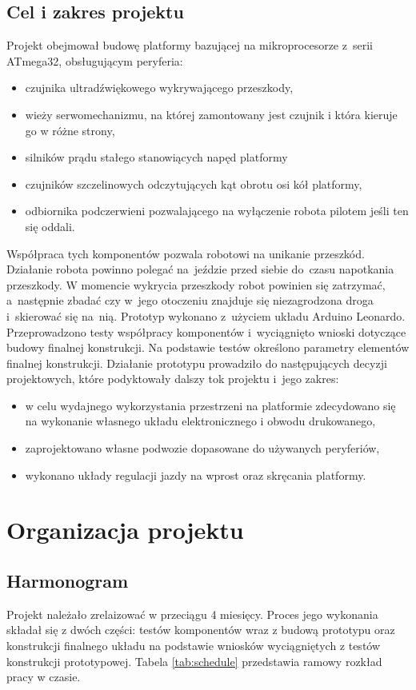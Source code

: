 \documentclass{article}
\begin{document}
\subsection{Cel i zakres projektu}
Projekt obejmował budowę platformy bazującej na mikroprocesorze z~serii ATmega32, obsługującym peryferia:
\begin{itemize}
	\item czujnika ultradźwiękowego wykrywającego przeszkody,
	\item wieży serwomechanizmu, na której zamontowany jest czujnik i która kieruje go w różne strony,
	\item silników prądu stałego stanowiących napęd platformy
	\item czujników szczelinowych odczytujących kąt obrotu osi kół platformy,
	\item odbiornika podczerwieni pozwalającego na wyłączenie robota pilotem jeśli ten się oddali.
\end{itemize}
Współpraca tych komponentów pozwala robotowi na unikanie przeszkód.
Działanie robota powinno polegać na~jeździe przed siebie do~czasu napotkania przeszkody.
W momencie wykrycia przeszkody robot powinien się zatrzymać, a~następnie zbadać czy w~jego otoczeniu znajduje się niezagrodzona droga i~skierować się na~nią.
Prototyp wykonano z~użyciem układu Arduino Leonardo.
Przeprowadzono testy współpracy komponentów i~wyciągnięto wnioski dotyczące budowy finalnej konstrukcji.
Na podstawie testów określono parametry elementów finalnej konstrukcji.
Działanie prototypu prowadziło do następujących decyzji projektowych, które podyktowały dalszy tok projektu i~jego zakres:
\begin{itemize}
	\item w celu wydajnego wykorzystania przestrzeni na platformie zdecydowano się na wykonanie własnego układu elektronicznego i obwodu drukowanego,
	\item zaprojektowano własne podwozie dopasowane do używanych peryferiów,
	\item wykonano układy regulacji jazdy na wprost oraz skręcania platformy.
\end{itemize}

\section{Organizacja projektu}
\subsection{Harmonogram}
Projekt należało zrelaizować w przeciągu 4 miesięcy.
Proces jego wykonania składał się z dwóch części: testów komponentów wraz z budową prototypu oraz konstrukcji finalnego układu na podstawie wniosków wyciągniętych z testów konstrukcji prototypowej.
	Tabela \ref{tab:schedule} przedstawia ramowy rozkład pracy w czasie.
\end{document}
